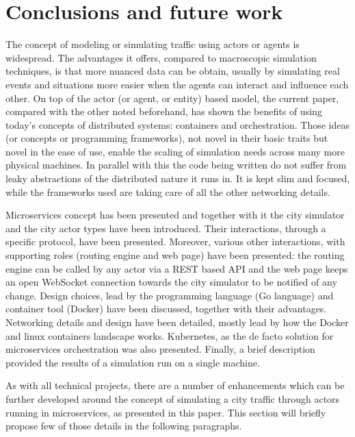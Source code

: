 \documentclass[conference]{IEEEtran}
\begin{document}
\section{Conclusions and future work}
\label{sec:enhancements}

The concept of modeling or simulating traffic using actors or agents is widespread. The advantages it offers, compared to macroscopic simulation techniques, is that more nuanced data can be obtain, usually by simulating real events and situations more easier when the agents can interact and influence each other. On top of the actor (or agent, or entity) based model, the current paper, compared with the other noted beforehand, has shown the benefits of using today's concepts of distributed systems: containers and orchestration. Those ideas (or concepts or programming frameworks), not novel in their basic traits but novel in the ease of use, enable the scaling of simulation needs across many more physical machines. In parallel with this the code being written do not suffer from leaky abstractions of the distributed nature it runs in. It is kept slim and focused, while the frameworks used are taking care of all the other networking details.

Microservices concept has been presented and together with it the city simulator and the city actor types have been introduced. Their interactions, through a specific protocol, have been presented. Moreover, various other interactions, with supporting roles (routing engine and web page) have been presented: the routing engine can be called by any actor via a REST based API and the web page keeps an open WebSocket connection towards the city simulator to be notified of any change. Design choices, lead by the programming language (Go language) and container tool (Docker) have been discussed, together with their advantages. Networking details and design have been detailed, mostly lead by how the Docker and linux containers landscape works. Kubernetes, as the de facto solution for microservices orchestration was also presented. Finally, a brief description provided the results of a simulation run on a single machine.

\balance

As with all technical projects, there are a number of enhancements which can be further developed around the concept of simulating a city traffic through actors running in microservices, as presented in this paper. This section will briefly propose few of those details in the following paragraphs.
\end{document}
